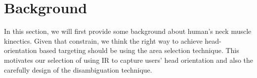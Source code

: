 
\section{Background}
\label{sec:background}


 

In this section, we will first provide some background about human's neck muscle kinectics. Given that constrain, we think the right way to achieve head-orientation based targeting should be using the area selection technique. This motivates our selection of using IR to capture users' head orientation and also the carefully design of the disambiguation technique.



